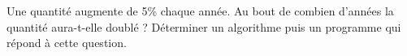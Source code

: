 
Une quantité augmente de 5\% chaque année. Au bout de combien d'années la quantité aura-t-elle doublé ?
Déterminer un algorithme puis un programme qui répond à cette question. 